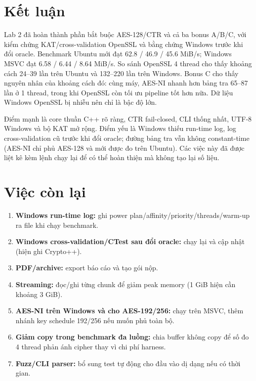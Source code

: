 \documentclass[12pt,a4paper,oneside]{report}
\let\origtexttt\texttt
\renewcommand{\texttt}[1]{\origtexttt{\seqsplit{#1}}}
\begin{document}
\section{Kết luận}


Lab 2 đã hoàn thành phần bắt buộc AES-128/CTR và cả ba bonus A/B/C, với kiểm chứng KAT/cross-validation OpenSSL và bằng chứng Windows trước khi đổi oracle. Benchmark Ubuntu mới đạt 62.8 / 46.9 / 45.6 MiB/s; Windows MSVC đạt 6.58 / 6.44 / 8.64 MiB/s. So sánh OpenSSL 4 thread cho thấy khoảng cách 24–39 lần trên Ubuntu và 132–220 lần trên Windows. Bonus C cho thấy nguyên nhân của khoảng cách đó: cùng máy, AES-NI nhanh hơn bảng tra 65–87 lần ở 1 thread, trong khi OpenSSL còn tối ưu pipeline tốt hơn nữa. Dữ liệu Windows OpenSSL bị nhiễu nên chỉ là bậc độ lớn.


Điểm mạnh là core thuần C++ rõ ràng, CTR fail-closed, CLI thống nhất, UTF-8 Windows và bộ KAT mở rộng. Điểm yếu là Windows thiếu run-time log, log cross-validation cũ trước khi đổi oracle; đường bảng tra vẫn không constant-time (AES-NI chỉ phủ AES-128 và mới được đo trên Ubuntu). Các việc này đã được liệt kê kèm lệnh chạy lại để có thể hoàn thiện mà không tạo lại số liệu.


\section{Việc còn lại}


\begin{enumerate}[leftmargin=*]
\item \textbf{Windows run-time log:} ghi power plan/affinity/priority/threads/warm-up ra file khi chạy benchmark.
\item \textbf{Windows cross-validation/CTest sau đổi oracle:} chạy lại và cập nhật \texttt{environment.txt} (hiện ghi Crypto++).
\item \textbf{PDF/archive:} export báo cáo và tạo gói nộp.
\item \textbf{Streaming:} đọc/ghi từng chunk để giảm peak memory (1 GiB hiện cần khoảng 3 GiB).
\item \textbf{AES-NI trên Windows và cho AES-192/256:} chạy \texttt{--impl ni} trên MSVC, thêm nhánh key schedule 192/256 nếu muốn phủ toàn bộ.
\item \textbf{Giảm copy trong benchmark đa luồng:} chia buffer không copy để số đo 4 thread phản ánh cipher thay vì chi phí harness.
\item \textbf{Fuzz/CLI parser:} bổ sung test tự động cho đầu vào dị dạng nếu có thời gian.
\end{enumerate}
\end{document}

